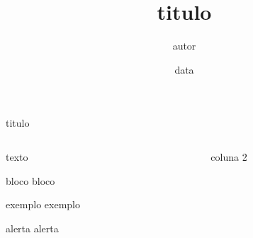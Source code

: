 \documentclass{beamer}
\title[titulopequeno]{titulo}
\date[datapequena]{data}
\author[autorpequeno]{autor}
\institute[institutopequeno]{instituto}
\begin{document}
	
\begin{frame}
	\titlepage
\end{frame}	
	
\begin{frame}{titulo}
\begin{columns}
	
	\begin{column}{0.5\textwidth}
		texto
		
		\begin{block}{bloco}
			bloco
		\end{block}
		\begin{example}{exemplo}
			exemplo
		\end{example}
		\begin{alertblock}{alerta}
			alerta
		\end{alertblock}
	
	\end{column}
	\begin{column}{0.5\textwidth}
		coluna 2
	\end{column}
	
	
	
\end{columns}
\end{frame}
\end{document}

